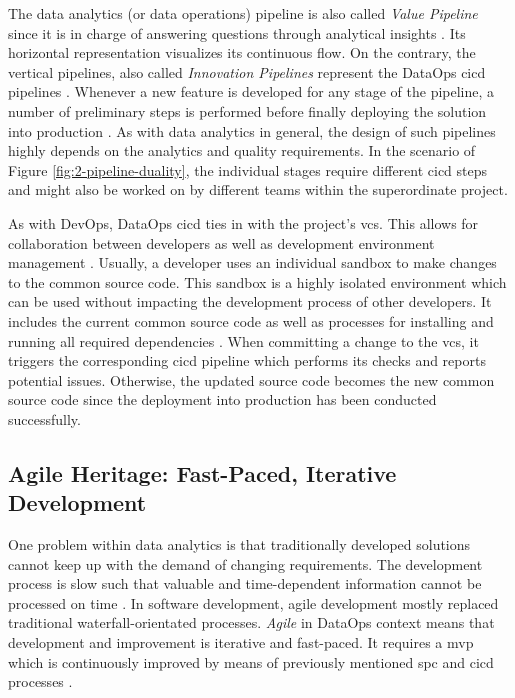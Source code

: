 The data analytics (or data operations) pipeline is also called \textit{Value Pipeline} since it is in charge of answering questions through analytical insights \cite[32\psq]{Bergh2019}. Its horizontal representation visualizes its continuous flow. On the contrary, the vertical pipelines, also called \textit{Innovation Pipelines} represent the DataOps \ac{cicd} pipelines \cite[66]{Schmidt2019}. Whenever a new feature is developed for any stage of the pipeline, a number of preliminary steps is performed before finally deploying the solution into production \cite[33]{Bergh2019}. As with data analytics in general, the design of such pipelines highly depends on the analytics and quality requirements. In the scenario of Figure \ref{fig:2-pipeline-duality}, the individual stages require different \ac{cicd} steps and might also be worked on by different teams within the superordinate project.

As with DevOps, DataOps \ac{cicd} ties in with the project's \acf{vcs}. This allows for collaboration between developers as well as development environment management \cite{Davis2020}. Usually, a developer uses an individual sandbox to make changes to the common source code. This sandbox is a highly isolated environment which can be used without impacting the development process of other developers. It includes the current common source code as well as processes for installing and running all required dependencies \cite[41]{Bergh2019}. When committing a change to the \ac{vcs}, it triggers the corresponding \ac{cicd} pipeline which performs its checks and reports potential issues. Otherwise, the updated source code becomes the new common source code since the deployment into production has been conducted successfully.

\subsection{Agile Heritage: Fast-Paced, Iterative Development}
One problem within data analytics is that traditionally developed solutions cannot keep up with the demand of changing requirements. The development process is slow such that valuable and time-dependent information cannot be processed on time \cite{Lockner2019}. In software development, agile development mostly replaced traditional waterfall-orientated processes. \textit{Agile} in DataOps context means that development and improvement is iterative and fast-paced. It requires a \ac{mvp} which is continuously improved by means of previously mentioned \ac{spc} and \ac{cicd} processes \cite[19\psq]{Bergh2019}.
